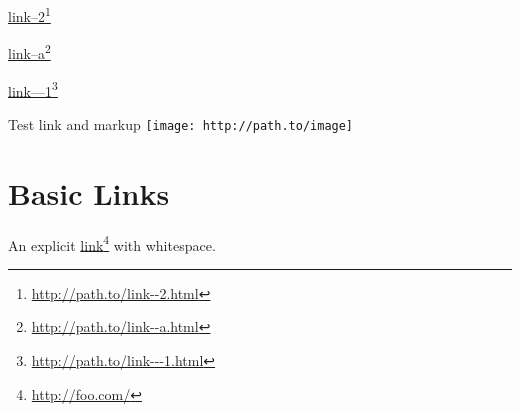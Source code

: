 \href{http://path.to/link--2.html}{link--2}\footnote{\href{http://path.to/link--2.html}{http:/\slash path.to\slash link-{}-{}2.html}}

\href{http://path.to/link--a.html}{link--a}\footnote{\href{http://path.to/link--a.html}{http:/\slash path.to\slash link-{}-{}a.html}}

\href{http://path.to/link---1.html}{link---1}\footnote{\href{http://path.to/link---1.html}{http:/\slash path.to\slash link-{}-{}-{}1.html}}

Test link and markup \texttt{[image: http://path.to/image]}

\part{Basic Links}
\label{basiclinks}

An explicit \href{http://foo.com/}{link}\footnote{\href{http://foo.com/}{http:/\slash foo.com\slash }} with whitespace.




